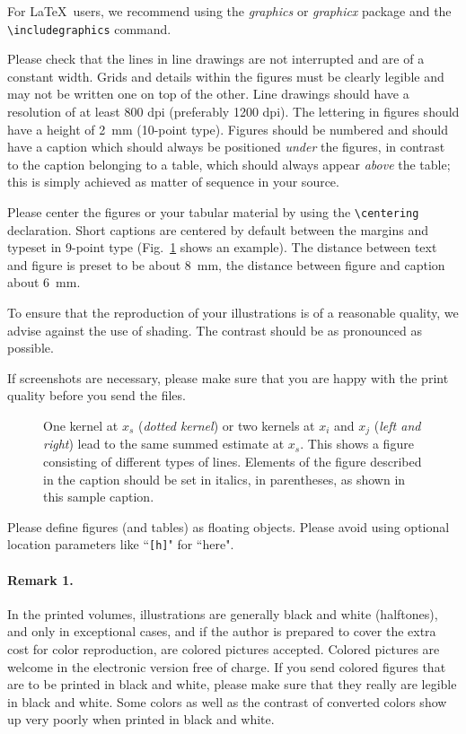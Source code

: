 \documentclass[runningheads]{llncs}
\begin{document}
For \LaTeX\ users, we recommend using the \emph{graphics} or \emph{graphicx}
package and the \verb+\includegraphics+ command.

Please check that the lines in line drawings are not
interrupted and are of a constant width. Grids and details within the
figures must be clearly legible and may not be written one on top of
the other. Line drawings should have a resolution of at least 800 dpi
(preferably 1200 dpi). The lettering in figures should have a height of
2~mm (10-point type). Figures should be numbered and should have a
caption which should always be positioned \emph{under} the figures, in
contrast to the caption belonging to a table, which should always appear
\emph{above} the table; this is simply achieved as matter of sequence in
your source.

Please center the figures or your tabular material by using the \verb+\centering+
declaration. Short captions are centered by default between the margins
and typeset in 9-point type (Fig.~\ref{fig:example} shows an example).
The distance between text and figure is preset to be about 8~mm, the
distance between figure and caption about 6~mm.

To ensure that the reproduction of your illustrations is of a reasonable
quality, we advise against the use of shading. The contrast should be as
pronounced as possible.

If screenshots are necessary, please make sure that you are happy with
the print quality before you send the files.
\begin{figure}
\centering
\caption{One kernel at $x_s$ (\emph{dotted kernel}) or two kernels at
$x_i$ and $x_j$ (\textit{left and right}) lead to the same summed estimate
at $x_s$. This shows a figure consisting of different types of
lines. Elements of the figure described in the caption should be set in
italics, in parentheses, as shown in this sample caption.}
\label{fig:example}
\end{figure}

Please define figures (and tables) as floating objects. Please avoid
using optional location parameters like ``\verb+[h]+" for ``here".

\paragraph{Remark 1.}

In the printed volumes, illustrations are generally black and white
(halftones), and only in exceptional cases, and if the author is
prepared to cover the extra cost for color reproduction, are colored
pictures accepted. Colored pictures are welcome in the electronic
version free of charge. If you send colored figures that are to be
printed in black and white, please make sure that they really are
legible in black and white. Some colors as well as the contrast of
converted colors show up very poorly when printed in black and white.
\end{document}
